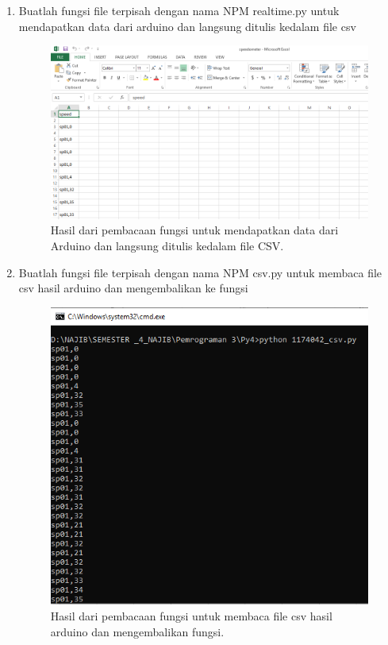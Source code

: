 \begin{enumerate}
	\item Buatlah fungsi file terpisah dengan nama NPM realtime.py untuk mendapatkan data dari arduino dan langsung ditulis kedalam file csv
	

	\begin{figure}[H]
		\includegraphics[width=12cm]{figures/5/1174042/Praktek/3.png}
		\centering
		\caption{Hasil dari pembacaan fungsi untuk mendapatkan data dari Arduino dan langsung ditulis kedalam file CSV.}
	\end{figure}
	
	\item Buatlah fungsi file terpisah dengan nama NPM csv.py untuk membaca file csv hasil arduino dan mengembalikan ke fungsi
	

	\begin{figure}[H]
		\includegraphics[width=12cm]{figures/5/1174042/Praktek/4.png}
		\centering
		\caption{Hasil dari pembacaan fungsi untuk membaca file csv hasil arduino dan mengembalikan fungsi.}
	\end{figure}
	
\end{enumerate}

